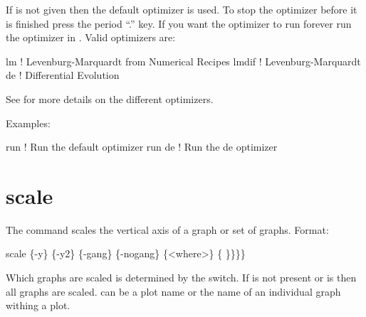 \vskip 0.2in 

If  is not given then the default optimizer is
used. To stop the optimizer before it is finished press the period
``.''  key. If you want the optimizer to run forever run the optimizer
in . Valid optimizers are:
\begin{example}
  lm            ! Levenburg-Marquardt from Numerical Recipes 
  lmdif         ! Levenburg-Marquardt 
  de            ! Differential Evolution
\end{example}
See  for more details on the different
optimizers.

Examples:
\begin{example}
  run         ! Run the default optimizer
  run de      ! Run the de optimizer
\end{example}

\section{scale}
\label{s:scale}

The  command scales the vertical axis of a graph or set of graphs.
Format:
\begin{example}
  scale \{-y\} \{-y2\} \{-gang\} \{-nogang\} \{<where>\} \{<value1> \}<value2>\}\}\}
\end{example}

Which graphs are scaled is determined by the  switch. If
 is not present or  is  then all
graphs are scaled.  can be a plot name or the name of an
individual graph withing a plot.

\vskip 0.2in 

